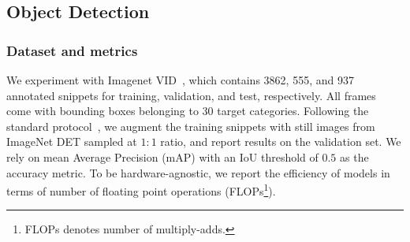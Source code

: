 \documentclass[runningheads]{llncs}
\begin{document}
\subsection{Object Detection}
\label{sec:exp_detection}
\subsubsection{Dataset and metrics}
We experiment with Imagenet VID~\cite{vid}, which contains 3862, 555, and 937 annotated snippets for training, validation, and test, respectively. All frames come with bounding boxes belonging to $30$ target categories.
Following the standard protocol~\cite{mega,flow_guided,fgfa,zhu17dff}, we augment the training snippets with still images from ImageNet DET sampled at $1:1$ ratio, and report results on the validation set. We rely on mean Average Precision (mAP) with an IoU threshold of $0.5$ as the accuracy metric.
To be hardware-agnostic, we report the efficiency of models in terms of number of floating point operations (FLOPs\footnote{FLOPs denotes number of multiply-adds.}).
\end{document}
